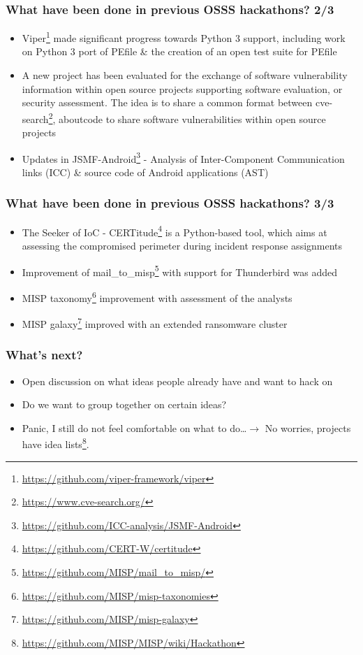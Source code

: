 \documentclass{beamer}
\begin{document}
  \begin{frame}
    \frametitle{What have been done in previous OSSS hackathons? 2/3}
    \begin{itemize}
      \item Viper\footnote{\url{https://github.com/viper-framework/viper}} made significant progress towards Python 3 support, including work on Python 3 port of PEfile \& the creation of an open test suite for PEfile
      \item A new project has been evaluated for the exchange of software vulnerability information within open source projects supporting software evaluation, or security assessment. The idea is to share a common format between cve-search\footnote{\url{https://www.cve-search.org/}}, aboutcode to share software vulnerabilities within open source projects
      \item Updates in JSMF-Android\footnote{\url{https://github.com/ICC-analysis/JSMF-Android}} - Analysis of Inter-Component Communication links (ICC) \& source code of Android applications (AST)
    \end{itemize}
  \end{frame}

  \begin{frame}
    \frametitle{What have been done in previous OSSS hackathons? 3/3}
    \begin{itemize}
      \item The Seeker of IoC - CERTitude\footnote{\url{https://github.com/CERT-W/certitude}} is a Python-based tool, which aims at assessing the compromised perimeter during incident response assignments
      \item Improvement of mail\_to\_misp\footnote{\url{https://github.com/MISP/mail_to_misp/}} with support for Thunderbird was added
      \item MISP taxonomy\footnote{\url{https://github.com/MISP/misp-taxonomies}} improvement with assessment of the analysts
      \item MISP galaxy\footnote{\url{https://github.com/MISP/misp-galaxy}} improved with an extended ransomware cluster
    \end{itemize}
  \end{frame}

  \begin{frame}
    \frametitle{What's next?}
    \begin{itemize}
    \item Open discussion on what ideas people already have and want to hack on
    \item Do we want to group together on certain ideas?
    \item Panic, I still do not feel comfortable on what to do\ldots $\to$ No worries, projects have idea lists\footnote{\url{https://github.com/MISP/MISP/wiki/Hackathon}}.
    \end{itemize}
  \end{frame}
\end{document}

